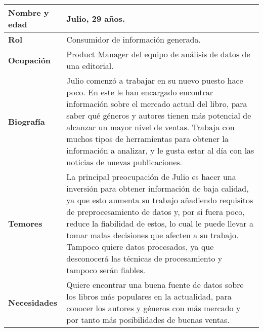 \begin{table}[H]
    \centering
    \begin{tabularx}{\columnwidth}{|l|X|}
        \hline
        \textbf{Nombre y edad} & Julio, 29 años. \\
        \hline
        \textbf{Rol} & Consumidor de información generada. \\
        \hline
        \textbf{Ocupación} & Product Manager del equipo de análisis de datos de una editorial. \\
        \hline
        \textbf{Biografía} & Julio comenzó a trabajar en su nuevo puesto hace poco. En este le han encargado encontrar información sobre el mercado actual del libro, para saber qué géneros y autores tienen más potencial de alcanzar un mayor nivel de ventas. Trabaja con muchos tipos de herramientas para obtener la información a analizar, y le gusta estar al día con las noticias de nuevas publicaciones. \\
        \hline
        \textbf{Temores} & La principal preocupación de Julio es hacer una inversión para obtener información de baja calidad, ya que esto aumenta su trabajo añadiendo requisitos de preprocesamiento de datos y, por si fuera poco, reduce la fiabilidad de estos, lo cual le puede llevar a tomar malas decisiones que afecten a su trabajo. Tampoco quiere datos procesados, ya que desconocerá las técnicas de procesamiento y tampoco serán fiables. \\
        \hline
        \textbf{Necesidades} & Quiere encontrar una buena fuente de datos sobre los libros más populares en la actualidad, para conocer los autores y géneros con más mercado y por tanto más posibilidades de buenas ventas. \\
        \hline
    \end{tabularx}
\end{table}

